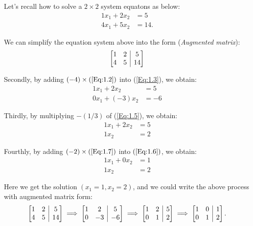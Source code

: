 \begin{example}
Let's recall how to solve a $2 \times 2$ system equatons as below:
\begin{align}
1x_1 + 2x_2 &= 5\label{Eq:1.2}\\
4x_1 + 5x_2 &=14\label{Eq:1.3}.
\end{align}

We can simplify the equation system above into the form (\emph{Augmented matrix}):
\[
\left[
\begin{array}{@{}cc|c@{}}
1 & 2 & 5 \\
4 & 5 & 14
\end{array}
\right]
\]

Secondly, by adding $(-4)\times(\ref{Eq:1.2})$ into (\ref{Eq:1.3}), we obtain:
\begin{align}
{1}x_1 + 2x_2 &=5\label{Eq:1.4}\\
0x_1 + (-3)x_2 &= -6\label{Eq:1.5}
\end{align}

Thirdly, by multiplying $-(1/3)$ of (\ref{Eq:1.5}), we obtain:
\begin{align}
{1}x_1 + 2x_2 &=5 \label{Eq:1.6}\\
1x_2 &= 2\label{Eq:1.7}
\end{align}

Fourthly, by adding $(-2)\times(\ref{Eq:1.7})$ into $(\ref{Eq:1.6})$, we obtain:
\begin{align}
{1}x_1 + 0x_2 &=1 	\\
1x_2 &= 2 
\end{align}

Here we get the solution $(x_1=1, x_2=2)$, and we could write the above process with augmented matrix form:
\[
\left[
\begin{array}{@{}cc|c@{}}
1 & 2 & 5 \\
4 & 5 & 14
\end{array}
\right]
\implies
\left[
\begin{array}{@{}cc|c@{}}
1 & 2 & 5 \\
0& -3 & -6
\end{array}
\right]
\implies
\left[
\begin{array}{@{}cc|c@{}}
1 & 2 & 5 \\
0& 1 & 2
\end{array}
\right]
\implies
\left[
\begin{array}{@{}cc|c@{}}
1 & 0 & 1 \\
0& 1 & 2
\end{array}
\right].
\]
\end{example}

